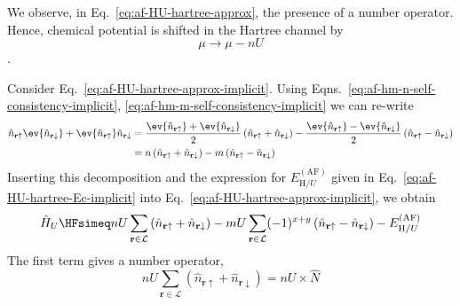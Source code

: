 We observe, in Eq.~\eqref{eq:af-HU-hartree-approx}, the presence of a number operator. Hence, chemical potential is shifted in the Hartree channel by
\begin{equation}\label{eq:af-mu-hU}
	\mu \to \mu - nU
\end{equation}.

\begin{tabproof}
	
	Consider Eq.~\eqref{eq:af-HU-hartree-approx-implicit}. Using Eqns.~\eqref{eq:af-hm-n-self-consistency-implicit}, \eqref{eq:af-hm-m-self-consistency-implicit} we can re-write
	\[
	\begin{aligned}
		\hat n_{\mathbf{r}\uparrow} \ev{\hat n_{\mathbf{r}\downarrow}} + \ev{\hat n_{\mathbf{r}\uparrow}} \hat n_{\mathbf{r}\downarrow}
		&= \frac{\ev{\hat n_{\mathbf{r}\uparrow}} + \ev{\hat n_{\mathbf{r}\downarrow}}}{2} \left(
		\hat n_{\mathbf{r}\uparrow} + \hat n_{\mathbf{r}\downarrow}
		\right) - \frac{\ev{\hat n_{\mathbf{r}\uparrow}} - \ev{\hat n_{\mathbf{r}\downarrow}}}{2} \left(
		\hat n_{\mathbf{r}\uparrow} - \hat n_{\mathbf{r}\downarrow}
		\right) \\
		&= n \left(
		\hat n_{\mathbf{r}\uparrow} + \hat n_{\mathbf{r}\downarrow}
		\right) - m \left(
		\hat n_{\mathbf{r}\uparrow} - \hat n_{\mathbf{r}\downarrow}
		\right)
	\end{aligned}
	\]
	Inserting this decomposition and the expression for $E_{\mathrm{H}/U}^{(\mathrm{AF})}$ given in Eq.~\eqref{eq:af-HU-hartree-Ec-implicit} into Eq.~\eqref{eq:af-HU-hartree-approx-implicit}, we obtain
	\begin{equation} \label{eq:af-HU-hartree-Ec-implicit-int1}
		\hat H_U \HFsimeq nU \sum_{\mathbf{r}\in\mathcal{L}} \left(
		\hat n_{\mathbf{r}\uparrow} + \hat n_{\mathbf{r}\downarrow}
		\right) - mU \sum_{\mathbf{r}\in\mathcal{L}} (-1)^{x+y} \left(
		\hat n_{\mathbf{r}\uparrow} - \hat n_{\mathbf{r}\downarrow}
		\right) - E_{\mathrm{H}/U}^{(\mathrm{AF})}
	\end{equation}
	The first term gives a number operator,
	\[
	nU \sum_{\mathbf{r}\in\mathcal{L}} \left(
	\hat n_{\mathbf{r}\uparrow} + \hat n_{\mathbf{r}\downarrow}
	\right) = nU \times \hat N
	\]
	

\end{tabproof}
